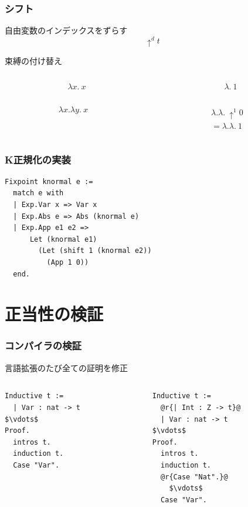 \documentclass[dvipdfmx,cjk,xcolor=dvipsnames,envcountsect,notheorems,12pt]{beamer}
\theoremstyle{definition}
\begin{document}
\begin{frame}
	\frametitle{シフト}
	\LARGE 自由変数のインデックスをずらす
	\[\uparrow^d t \]

	束縛の付け替え
	\begin{columns}
		\begin{column}{0.5\textwidth}
			\[ \lambda x.~x \]
		\end{column}
		\begin{column}{0.5\textwidth}
			\[ \lambda.~1 \]
		\end{column}
	\end{columns}

	\vfill

	\begin{columns}
		\begin{column}{0.5\textwidth}
			\[ \lambda x.\lambda y.~x \]
		\end{column}
		\begin{column}{0.5\textwidth}
			\[
				\begin{array}{l}
					\lambda.\lambda.~\uparrow^1 0 \\
					= \lambda. \lambda.~1
				\end{array}
			\]
		\end{column}
	\end{columns}
\end{frame}

\begin{frame}[fragile]
	\frametitle{K正規化の実装}
\begin{lstlisting}[frame=none]
Fixpoint knormal e :=
  match e with
  | Exp.Var x => Var x
  | Exp.Abs e => Abs (knormal e)
  | Exp.App e1 e2 =>
      Let (knormal e1)
        (Let (shift 1 (knormal e2))
          (App 1 0))
  end.
\end{lstlisting}
\end{frame}

\section{正当性の検証}

\begin{frame}[fragile]
	\frametitle{コンパイラの検証}
	\LARGE 言語拡張のたび全ての証明を修正
	\begin{columns}
		\begin{column}{0.5\textwidth}
\begin{lstlisting}[frame=none]
Inductive t :=
  | Var : nat -> t
$\vdots$
Proof.
  intros t.
  induction t.
  Case "Var".
\end{lstlisting}
		\end{column}
		\begin{column}{0.5\textwidth}
\begin{lstlisting}[frame=none]
Inductive t :=
  @r{| Int : Z -> t}@
  | Var : nat -> t
$\vdots$
Proof.
  intros t.
  induction t.
  @r{Case "Nat".}@
    $\vdots$
  Case "Var".
\end{lstlisting}
		\end{column}
	\end{columns}
\end{frame}
\end{document}
